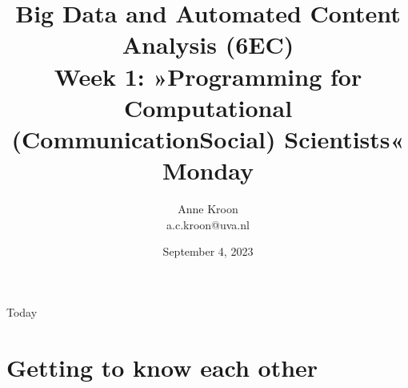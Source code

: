 

\graphicspath{{../../resources/img/}}



\title[Big Data and Automated Content Analysis]{\textbf{Big Data and Automated Content Analysis (6EC)} 
\\Week 1: »Programming for Computational (Communication\textbar Social) Scientists«
\\Monday }
\author[Anne Kroon]{Anne Kroon\\ \footnotesize{a.c.kroon@uva.nl}}
\date{September 4, 2023}


\begin{frame}{}
	\titlepage
\end{frame}

\begin{frame}{Today}
	\tableofcontents
\end{frame}

\section{Getting to know each other}

